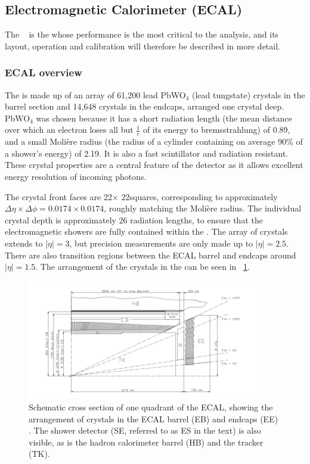 \subsection{Electromagnetic Calorimeter (ECAL)}
\label{sec:cms:ecal}

The \ECAL~\cite{CMSTDR,CMSEcalTDR} is the \subdetector whose performance is the most critical to the \Hgg analysis, and its layout, operation and calibration will therefore be described in more detail. 

\subsubsection{ECAL overview}
\label{sec:cms:ecal:overview}

The \ECAL is made up of an array of 61,200 lead PbWO$_4$ (lead tungstate) crystals in the barrel section and 14,648 crystals in the endcaps, arranged one crystal deep. PbWO$_4$ was chosen because it has a short radiation length (the mean distance over which an electron loses all but $\frac{1}{e}$ of its energy to bremsstrahlung) of 0.89\cm, and a small Moli\`ere radius (the radius of a cylinder containing on average 90\% of a shower's energy) of 2.19\cm. It is also a fast scintillator and radiation resistant. These crystal properties are a central feature of the \CMS detector as it allows excellent energy resolution of incoming photons. 

The \ECAL crystal front faces are 22\mm $\times$ 22\mm squares, corresponding to approximately $\Delta \eta \times \Delta \phi = 0.0174 \times 0.0174$, roughly matching the Moli\`ere radius. The individual crystal depth is approximately 26 radiation lengths, to ensure that the electromagnetic showers are fully contained within the \ECAL. The array of crystals extends to $|\eta| = 3$, but precision measurements are only made up to $|\eta| =2.5$. There are also transition regions between the ECAL barrel and endcaps around $|\eta| = 1.5$. The arrangement of the crystals in the \ECAL can be seen in \Fig~\ref{fig:ecal}.

\begin{figure}[h]
\centering
\includegraphics[width=0.9\textwidth]{detectorFigures/ecalEBEE.png}
\caption{Schematic cross section of one quadrant of the ECAL, showing the arrangement of crystals in the ECAL barrel (EB) and endcaps (EE) \cite{CMSEcalTDR}. The shower detector (SE, referred to as ES in the text) is also visible, as is the hadron calorimeter barrel (HB) and the tracker (TK).}
\label{fig:ecal}
\end{figure}


